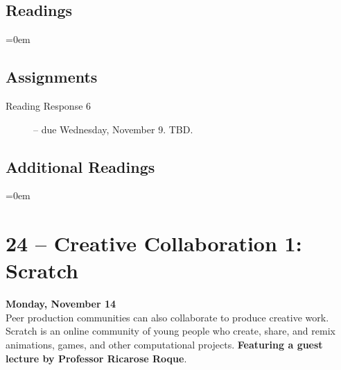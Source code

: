 \documentclass[10pt]{memoir}
\newenvironment{readinglist}{
\begin{list}{}{\leftmargin=8pt \itemindent=0em}
  \setlength{\itemsep}{8pt}
  \setlength{\parskip}{0em}
  \setlength{\parsep}{1em}
  \setlength{\parindent}{8em}}
{\end{list}}
\begin{document}
    \subsection{Readings}
    \begin{readinglist}
        \item {}
        \item {}
    \end{readinglist}
    
    \subsection{Assignments}
    \begin{description}%
        \item[Reading Response 6 ] -- due Wednesday, November 9. TBD.
    \end{description}
    
    \subsection{Additional Readings}
    \begin{readinglist}
        \item {}
        \item {}
        \item {}
        \item {}
        \item {}
        \item {}
        \item {}
    \end{readinglist}
    
\section{24 -- Creative Collaboration 1: Scratch}
\textcolor{CUGold}{\textbf{Monday, November 14}}\\
Peer production communities can also collaborate to produce creative work. Scratch is an online community of young people who create, share, and remix animations, games, and other computational projects. \textbf{Featuring a guest lecture by Professor Ricarose Roque}.
\end{document}
